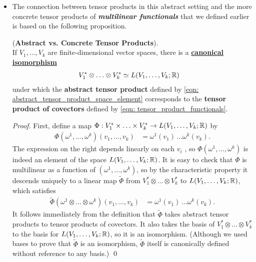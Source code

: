 \documentclass[11pt]{article}
\begin{document}
\begin{itemize}
\item The connection between tensor products in this abstract setting and the more concrete tensor products of \emph{\textbf{multilinear functionals}} that we defined earlier is based on the following proposition.
\begin{proposition} (\textbf{Abstract vs. Concrete Tensor Products}).\citep{lee2003introduction}\\
If $V_1,\ldots,V_k$  are finite-dimensional vector spaces, there is a \underline{\textbf{canonical isomorphism}}
\begin{align}
V_1^{*}\otimes \ldots \otimes V_k^{*} &\simeq L(V_1,\ldots,V_k ; {\mathbb R}) \label{eqn: abstract_covector_tensor_product_iso}
\end{align} under which the \textbf{abstract tensor product} defined by \eqref{eqn: abstract_tensor_product_space_element} corresponds to the \textbf{tensor product of covectors} defined by \eqref{eqn: tensor_product_functionals}.
\end{proposition}
\begin{proof}
First, define a map $\Phi: V_1^{*}\times \ldots \times V_k^{*} \rightarrow L(V_1,\ldots,V_k ; {\mathbb R})$ by
\begin{align*}
\Phi(\omega^{1}, \ldots, \omega^{k})(v_1, \ldots, v_k) &= \omega^{1}(v_1)\, \ldots  \omega^{k}(v_k).
\end{align*} The expression on the right depends linearly on each $v_i$ , so $\Phi(\omega^{1}, \ldots, \omega^{k})$ is indeed an element of the space $ L(V_1,\ldots,V_k ; {\mathbb R})$.  It is easy to check that $\Phi$ is multilinear as a function of $(\omega^{1}, \ldots, \omega^{k})$,  so by the characteristic property it descends uniquely to a linear map $\widetilde{\Phi}$ from $V_1^{*}\otimes \ldots \otimes V_k^{*}$ to $L(V_1,\ldots,V_k ; {\mathbb R})$, which satisfies
\begin{align*}
\widetilde{\Phi}(\omega^{1} \otimes  \ldots \otimes \omega^{k})(v_1, \ldots, v_k) &= \omega^{1}(v_1)\, \ldots  \omega^{k}(v_k).
\end{align*} It follows immediately from the definition that $\widetilde{\Phi}$ takes abstract tensor products to tensor products of covectors. It also takes the basis of $V_1^{*}\otimes \ldots \otimes V_k^{*}$  to the basis for $L(V_1,\ldots,V_k ; {\mathbb R})$, so it is an isomorphism. (Although we used bases to prove that  $\widetilde{\Phi}$  is an isomorphism, $\widetilde{\Phi}$ itself is canonically defined without reference to any basis.) \qed
\end{proof}




\end{itemize}
\end{document}
